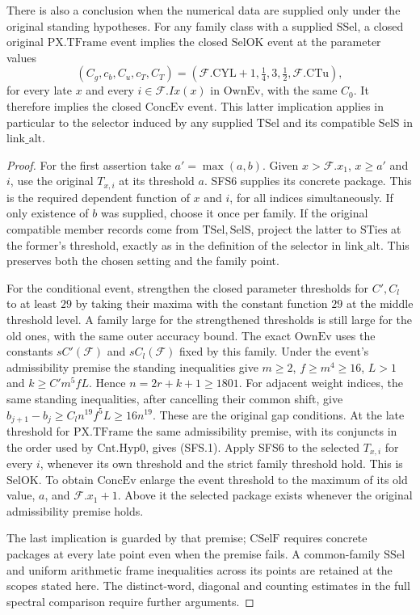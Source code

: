 There is also a conclusion when the numerical data are supplied
only under the original standing hypotheses. For any family class
with a supplied $\mathrm{SSel}$, a closed original
$\mathrm{PX.TFrame}$ event implies the closed $\mathrm{SelOK}$ event
at the parameter values
\[
 (C_g,c_b,C_u,c_T,C_T)
  =(\mathcal F.\mathrm{CYL}+1,\tfrac14,3,\tfrac12,\mathcal F.\mathrm{CTu}),
\]
for every late $x$ and every $i\in\mathcal F.Ix(x)$ in
$\mathrm{OwnEv}$, with the same $C_0$. It therefore implies the closed
$\mathrm{ConcEv}$ event. This latter implication
applies in particular to the selector induced by any supplied
$\mathrm{TSel}$ and its compatible $\mathrm{SelS}$ in
$\mathrm{link\_alt}$.

\begin{proof}
For the first assertion take $a'=\max(a,b)$. Given $x>\mathcal
F.x_1$, $x\ge a'$ and $i$, use the original $T_{x,i}$ at its
threshold $a$. SFS6 supplies its concrete package. This is the
required dependent function of $x$ and $i$, for all indices
simultaneously. If only existence of $b$ was supplied, choose it
once per family. If the original compatible member records come
from $\mathrm{TSel},\mathrm{SelS}$, project the latter to
$\mathrm{STies}$ at the former's threshold, exactly as in the
definition of the selector in $\mathrm{link\_alt}$. This preserves
both the chosen setting and the family point.

For the conditional event, strengthen the closed parameter
thresholds for $C',C_l$ to at least $29$ by taking their maxima
with the constant function $29$ at the middle threshold level.
A family large for the strengthened thresholds is still large
for the old ones, with the same outer accuracy bound. The exact
$\mathrm{OwnEv}$ uses the constants $sC'(\mathcal F)$ and
$sC_l(\mathcal F)$ fixed by this family. Under the event's
admissibility premise the standing inequalities give
$m\ge2$, $f\ge m^4\ge16$, $L>1$ and
$k\ge C'm^5 f L$. Hence $n=2r+k+1\ge1801$.
For adjacent weight indices, the same standing inequalities,
after cancelling their common shift, give
$b_{j+1}-b_j\ge C_l n^{19} f^5 L\ge16n^{19}$.
These are the original gap conditions. At the late threshold for
$\mathrm{PX.TFrame}$ the same admissibility premise, with
its conjuncts in the order used by $\mathrm{Cnt.Hyp0}$, gives
(SFS.1). Apply SFS6 to the selected $T_{x,i}$ for every $i$,
whenever its own threshold and the strict family threshold hold.
This is $\mathrm{SelOK}$. To obtain $\mathrm{ConcEv}$ enlarge
the event threshold to the maximum of its old value,
$a$, and $\mathcal F.x_1+1$. Above it the selected package
exists whenever the original admissibility premise holds.

The last implication is guarded by that premise; $\mathrm{CSelF}$
requires concrete packages at every late point even when the premise
fails. A common-family $\mathrm{SSel}$ and uniform arithmetic
frame inequalities across its points are retained at the scopes
stated here. The distinct-word, diagonal and counting estimates in
the full spectral comparison require further arguments.
\end{proof}
